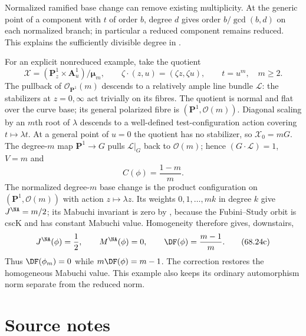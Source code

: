 \begin{example}
\label{ex:ytd-nonreduced-central}
Normalized ramified base change can remove existing multiplicity. At
the generic point of a component with $t$ of order $b$, degree $d$ gives
order $b/\gcd(b,d)$ on each normalized branch; in particular a reduced
component remains reduced. This explains the sufficiently divisible
degree in .

For an explicit nonreduced example, take the quotient
\[
 \mathcal X=(\mathbf P^1_z\times\mathbf A^1_u)/\boldsymbol\mu_m,
 \qquad \zeta\cdot(z,u)=(\zeta z,\zeta u),\qquad t=u^m,
 \quad m\geq2.
\]
The pullback of $\mathcal O_{\mathbf P^1}(m)$ descends to a relatively
ample line bundle $\mathcal L$: the stabilizers at $z=0,\infty$ act
trivially on its fibres. The quotient is normal and flat over the curve
base; its general polarized fibre is $(\mathbf P^1,\mathcal O(m))$.
Diagonal scaling by an $m$th root of $\lambda$ descends to a well-defined
test-configuration action covering $t\mapsto\lambda t$.
At a general point of $u=0$ the quotient has no stabilizer, so
$\mathcal X_0=mG$. The degree-$m$ map $\mathbf P^1\to G$ pulls
$\mathcal L|_G$ back to $\mathcal O(m)$; hence
$(G\cdot\mathcal L)=1$, $V=m$ and
\[
 C(\phi)=\frac{1-m}{m}.
\tag{68.24b}\label{eq:ytd-quotient-correction}
\]
The normalized degree-$m$ base change is the product configuration on
$(\mathbf P^1,\mathcal O(m))$ with action $z\mapsto\lambda z$.
Its weights $0,1,\ldots,mk$ in degree $k$ give $J^{\NA}=m/2$;
its Mabuchi invariant is zero by ,
because the Fubini--Study orbit is cscK and has constant Mabuchi value.
Homogeneity therefore gives, downstairs,
\[
 J^{\NA}(\phi)=\frac12,\qquad M^{\NA}(\phi)=0,
 \qquad \DF(\phi)=\frac{m-1}{m}.
\tag{68.24c}\label{eq:ytd-quotient-df}
\]
Thus $\DF(\phi_m)=0$ while $m\DF(\phi)=m-1$. The correction restores
the homogeneous Mabuchi value. This example also keeps its ordinary
automorphism norm separate from the reduced norm.
\end{example}

\section*{Source notes}
\label{sec:ytd-source-notes}


